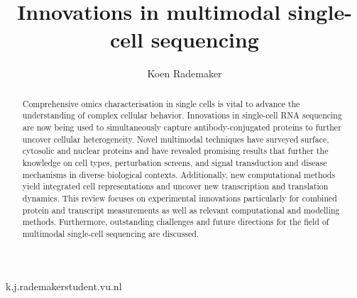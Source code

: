 \documentclass[times, twoside, watermark]{zHenriquesLab-StyleBioRxiv}
\begin{document}
\title{Innovations in multimodal single-cell sequencing}


\author[1]{Koen Rademaker}

\maketitle

\begin{abstract}
Comprehensive omics characterisation in single cells is vital to advance the understanding of complex cellular behavior. Innovations in single-cell RNA sequencing are now being used to simultaneously capture antibody-conjugated proteins to further uncover cellular heterogeneity. Novel multimodal techniques have surveyed surface, cytosolic and nuclear proteins and have revealed promising results that further the knowledge on cell types, perturbation screens, and signal transduction and disease mechanisms in diverse biological contexts. Additionally, new computational methods yield integrated cell representations and uncover new transcription and translation dynamics. This review focuses on experimental innovations particularly for combined protein and transcript measurements as well as relevant computational and modelling methods. Furthermore, outstanding challenges and future directions for the field of multimodal single-cell sequencing are discussed.
\end {abstract}

\begin{corrauthor}
k.j.rademaker\at student.vu.nl
\end{corrauthor}
\end{document}
